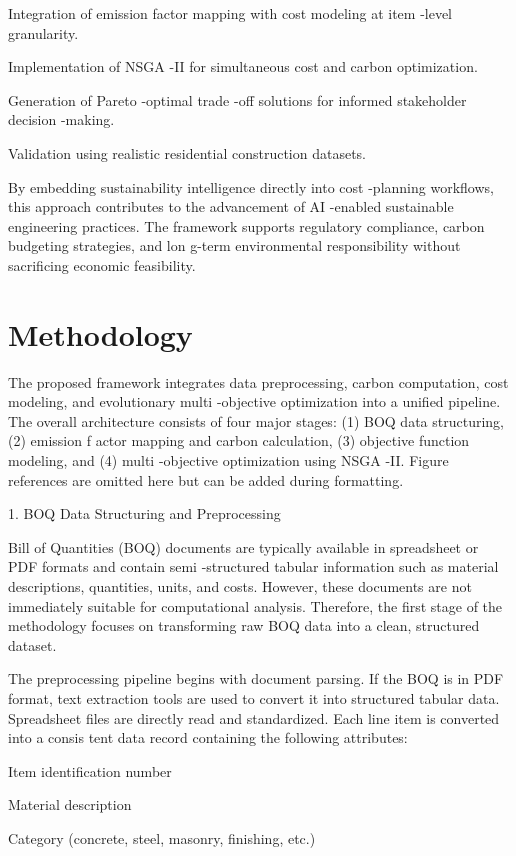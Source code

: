\documentclass[10pt,twocolumn]{article}
\begin{document}
Integration of emission factor mapping with cost modeling at item -level granularity.  
 
Implementation of NSGA -II for simultaneous cost and carbon optimization.  
 
Generation of Pareto -optimal trade -off solutions for informed stakeholder decision -making.  
 
Validation using realistic residential construction datasets.  
 
By embedding sustainability intelligence directly into cost -planning workflows, this approach 
contributes to the advancement of AI -enabled sustainable engineering practices. The framework 
supports regulatory compliance, carbon budgeting strategies, and lon g-term environmental 
responsibility without sacrificing economic feasibility.

\section{Methodology}
The proposed framework integrates data preprocessing, carbon computation, cost modeling, and
evolutionary multi -objective optimization into a unified pipeline. The overall architecture consists of 
four major stages: (1) BOQ data structuring, (2) emission f actor mapping and carbon calculation, (3) 
objective function modeling, and (4) multi -objective optimization using NSGA -II. Figure references 
are omitted here but can be added during formatting.  
 
1. BOQ Data Structuring and Preprocessing  
 
Bill of Quantities (BOQ) documents are typically available in spreadsheet or PDF formats and contain 
semi -structured tabular information such as material descriptions, quantities, units, and costs. 
However, these documents are not immediately suitable for computational analysis. Therefore, the 
first stage of the methodology focuses on transforming raw BOQ data into a clean, structured 
dataset.  
 
The preprocessing pipeline begins with document parsing. If the BOQ is in PDF format, text 
extraction tools are used to convert it into structured tabular data. Spreadsheet files are directly read 
and standardized. Each line item is converted into a consis tent data record containing the following 
attributes:  
 
Item identification number  
 
Material description  
 
Category (concrete, steel, masonry, finishing, etc.)  
 
\end{document}
